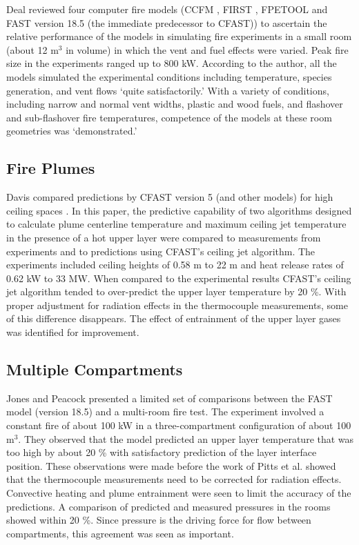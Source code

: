 Deal \cite{Valid:Deal} reviewed four computer fire models (CCFM \cite{Models:CCFM}, FIRST \cite{Models:FIRST}, FPETOOL \cite{Models:FPETool} and FAST \cite{Models:FAST} version 18.5 (the immediate predecessor to CFAST)) to ascertain the relative performance of the models in simulating fire experiments in a small room (about 12 m$^3$ in volume) in which the vent and fuel effects were varied. Peak fire size in the experiments ranged up to 800 kW. According to the author, all the models simulated the experimental conditions including temperature, species generation, and vent flows `quite satisfactorily.' With a variety of conditions, including narrow and normal vent widths, plastic and wood fuels, and flashover and sub-flashover fire temperatures, competence of the models at these room geometries was `demonstrated.'

\subsection{Fire Plumes}

Davis compared predictions by CFAST version 5 (and other models) for high ceiling spaces \cite{Valid:Davis_Plumes}. In this paper, the predictive capability of two algorithms designed to calculate plume centerline temperature and maximum ceiling jet temperature in the presence of a hot upper layer were compared to measurements from experiments and to predictions using CFAST's ceiling jet algorithm. The experiments included ceiling heights of 0.58 m to 22 m and heat release rates of 0.62 kW to 33 MW. When compared to the experimental results CFAST's ceiling jet algorithm tended to over-predict the upper layer temperature by 20 \%. With proper adjustment for radiation effects in the thermocouple measurements, some of this difference disappears. The effect of entrainment of the upper layer gases was identified for improvement.

\subsection{Multiple Compartments}
\label{secMultipleCompartments}

Jones and Peacock \cite{Valid:Jones} presented a limited set of comparisons between the FAST model (version 18.5) and a multi-room fire test. The experiment involved a constant fire of about 100 kW in a three-compartment configuration of about 100 m$^3$. They observed that the model predicted an upper layer temperature that was too high by about 20 \% with satisfactory prediction of the layer interface position. These observations were made before the work of Pitts et al. \cite{Valid:Pitts} showed that the thermocouple measurements need to be corrected for radiation effects. Convective heating and plume entrainment were seen to limit the accuracy of the predictions. A comparison of predicted and measured pressures in the rooms showed within 20 \%. Since pressure is the driving force for flow between compartments, this agreement was seen as important.

